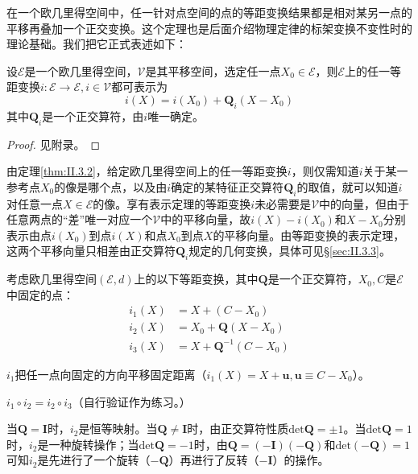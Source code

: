 \documentclass[../main.tex]{subfiles}
\begin{document}
在一个欧几里得空间中，任一针对点空间的点的等距变换结果都是相对某另一点的平移再叠加一个正交变换。这个定理也是后面介绍物理定律的标架变换不变性时的理论基础。我们把它正式表述如下：

\begin{theorem}[等距变换的表示定理]\label{thm:II.3.2}
    设$\mathcal{E}$是一个欧几里得空间，$\mathcal{V}$是其平移空间，选定任一点$X_0\in\mathcal{E}$，则$\mathcal{E}$上的任一等距变换$i:\mathcal{E}\rightarrow\mathcal{E},i\in\mathcal{V}$都可表示为
    \[
        i\left(X\right)=i\left(X_0\right)+\mathbf{Q}_i\left(X-X_0\right)
    \]
    其中$\mathbf{Q}_i$是一个正交算符，由$i$唯一确定。
\end{theorem}
\begin{proof}
    见附录。
\end{proof}

由定理\ref{thm:II.3.2}，给定欧几里得空间上的任一等距变换$i$，则仅需知道$i$关于某一参考点$X_0$的像是哪个点，以及由$i$确定的某特征正交算符$\mathbf{Q}_i$的取值，就可以知道$i$对任意一点$X\in\mathcal{E}$的像。享有表示定理的等距变换$i$未必需要是$\mathcal{V}$中的向量，但由于任意两点的“差”唯一对应一个$\mathcal{V}$中的平移向量，故$i\left(X\right)-i\left(X_0\right)$和$X-X_0$分别表示由点$i\left(X_0\right)$到点$i\left(X\right)$和点$X_0$到点$X$的平移向量。由等距变换的表示定理，这两个平移向量只相差由正交算符$\mathbf{Q}_i$规定的几何变换，具体可见\S\ref{sec:II.3.3}。

\begin{example}\label{exp:II.3.4}
    考虑欧几里得空间$\left(\mathcal{E},d\right)$上的以下等距变换，其中$\mathbf{Q}$是一个正交算符，$X_0,C$是$\mathcal{E}$中固定的点：
    \begin{align*}
        i_1\left(X\right) & =X+\left(C-X_0\right)                \\
        i_2\left(X\right) & =X_0+\mathbf{Q}\left(X-X_0\right)    \\
        i_3\left(X\right) & =X+\mathbf{Q}^{-1}\left(C-X_0\right)
    \end{align*}

    $i_1$把任一点向固定的方向平移固定距离（$i_1\left(X\right)=X+\mathbf{u},\mathbf{u}\equiv C-X_0$）。

    $i_1\circ i_2=i_2\circ i_3$（自行验证作为练习。）

    当$\mathbf{Q}=\mathbf{I}$时，$i_2$是恒等映射。当$\mathbf{Q}\neq\mathbf{I}$时，由正交算符性质$\mathrm{det}\mathbf{Q}=\pm 1$。当$\mathrm{det}\mathbf{Q}=1$时，$i_2$是一种旋转操作；当$\mathrm{det}\mathbf{Q}=-1$时，由$\mathbf{Q}=\left(-\mathbf{I}\right)\left(-\mathbf{Q}\right)$和$\mathrm{det}\left(-\mathbf{Q}\right)=1$可知$i_2$是先进行了一个旋转（$-\mathbf{Q}$）再进行了反转（$-\mathbf{I}$）的操作。
\end{example}
\end{document}
